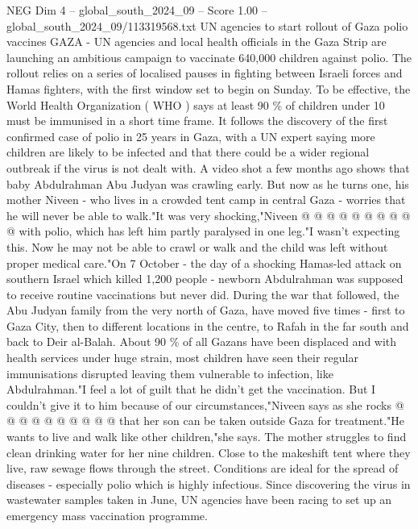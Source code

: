 \begin{textsample}{NEG Dim 4 – global\_south\_2024\_09 – Score 1.00 – global\_south\_2024\_09/113319568.txt}  \label{ex:f4_neg_187}
UN agencies to start rollout of Gaza polio vaccines GAZA - UN agencies and local health officials in the Gaza Strip are launching an ambitious campaign to vaccinate 640,000 children against polio.
The rollout relies on a series of localised pauses in fighting between Israeli forces and Hamas fighters, with the first window set to begin on Sunday.
To be effective, the World Health Organization ( WHO ) says at least 90 \% of children under 10 must be immunised in a short time frame.
It follows the discovery of the first confirmed case of polio in 25 years in Gaza, with a UN expert saying more children are likely to be infected and that there could be a wider regional outbreak if the virus is not dealt with.
A video shot a few months ago shows that baby Abdulrahman Abu Judyan was crawling early.
But now as he turns one, his mother Niveen - who lives in a crowded tent camp in central Gaza - worries that he will never be able to walk."It was very shocking,"Niveen @ @ @ @ @ @ @ @ @ @ with polio, which has left him partly paralysed in one leg."I wasn't expecting this.
Now he may not be able to crawl or walk and the child was left without proper medical care."On 7 October - the day of a shocking Hamas-led attack on southern Israel which killed 1,200 people - newborn Abdulrahman was supposed to receive routine vaccinations but never did.
During the war that followed, the Abu Judyan family from the very north of Gaza, have moved five times - first to Gaza City, then to different locations in the centre, to Rafah in the far south and back to Deir al-Balah.
About 90 \% of all Gazans have been displaced and with health services under huge strain, most children have seen their regular immunisations disrupted leaving them vulnerable to infection, like Abdulrahman."I feel a lot of guilt that he didn't get the vaccination.
But I couldn't give it to him because of our circumstances,"Niveen says as she rocks @ @ @ @ @ @ @ @ @ @ that her son can be taken outside Gaza for treatment."He wants to live and walk like other children,"she says.
The mother struggles to find clean drinking water for her nine children.
Close to the makeshift tent where they live, raw sewage flows through the street.
Conditions are ideal for the spread of diseases - especially polio which is highly infectious.
Since discovering the virus in wastewater samples taken in June, UN agencies have been racing to set up an emergency mass vaccination programme.

\end{textsample}
